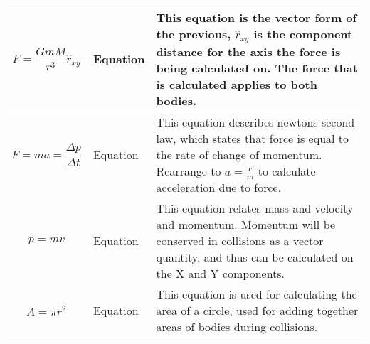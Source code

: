 \begin{table}[H]
\begin{tabular}{|M{3cm}|M{3cm}|m{8cm}|}
$$F=\frac{GmM}{r^3}\hat{r}_{xy}$$ & Equation & This equation is the vector form of the previous, $\hat{r}_{xy}$ is the component distance for the axis the force is being calculated on. The force that is calculated applies to both bodies. \\ \hline
$$F=ma=\frac{\Delta p}{\Delta t}$$ & Equation & This equation describes newtons second law, which states that force is equal to the rate of change of momentum. Rearrange to $a=\frac{F}{m}$ to calculate acceleration due to force. \\ \hline
$$p=mv$$ & Equation & This equation relates mass and velocity and momentum. Momentum will be conserved in collisions as a vector quantity, and thus can be calculated on the X and Y components. \\ \hline
$$A=\pi{r^2}$$ & Equation & This equation is used for calculating the area of a circle, used for adding together areas of bodies during collisions. \\ \hline
\end{tabular}
\end{table} 

\pagebreak